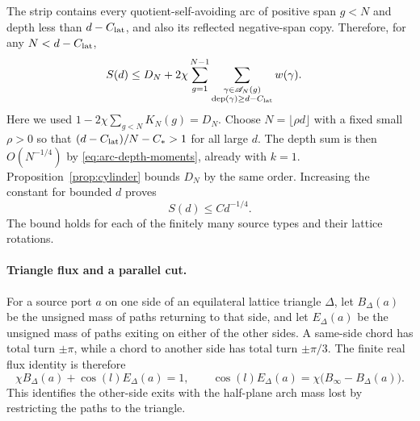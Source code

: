 The strip contains every quotient-self-avoiding arc of positive span
$g<N$ and depth less than $d-C_{\rm lat}$, and also its reflected
negative-span copy. Therefore, for any $N<d-C_{\rm lat}$,
\begin{equation}\label{eq:strip-quotient-bound}
 \begin{split}
 S(d)
 &\le D_N+
 2\chi\sum_{g=1}^{N-1}
       \sum_{\substack{\gamma\in\mathscr A_N(g)\\
                        \operatorname{dep}(\gamma)\ge d-C_{\rm lat}}}
             w(\gamma).
 \end{split}
\end{equation}
Here we used $1-2\chi\sum_{g<N}K_N(g)=D_N$. Choose
$N=\lfloor\rho d\rfloor$ with a fixed small $\rho>0$ so that
$(d-C_{\rm lat})/N-C_*>1$ for all large $d$. The depth sum is then
$O(N^{-1/4})$ by \eqref{eq:arc-depth-moments}, already with $k=1$.
Proposition~\ref{prop:cylinder} bounds $D_N$ by the same order.
Increasing the constant for bounded $d$ proves
\begin{equation}\label{eq:strip-crossing-bound}
 S(d)\le C d^{-1/4}.
\end{equation}
The bound holds for each of the finitely many source types and their
lattice rotations.

\paragraph{Triangle flux and a parallel cut.}
For a source port $a$ on one side of an equilateral lattice triangle
$\Delta$, let $B_\Delta(a)$ be the unsigned mass of paths returning to
that side, and let $E_\Delta(a)$ be the unsigned mass of paths exiting
on either of the other sides. A same-side chord has total turn
$\pm\pi$, while a chord to another side has total turn $\pm\pi/3$.
The finite real flux identity is therefore
\begin{equation}\label{eq:triangle-flux}
 \chi B_\Delta(a)+\cos(l)E_\Delta(a)=1,\qquad
 \cos(l)E_\Delta(a)=\chi\bigl(B_\infty-B_\Delta(a)\bigr).
\end{equation}
This identifies the other-side exits with the half-plane arch mass lost
by restricting the paths to the triangle.

